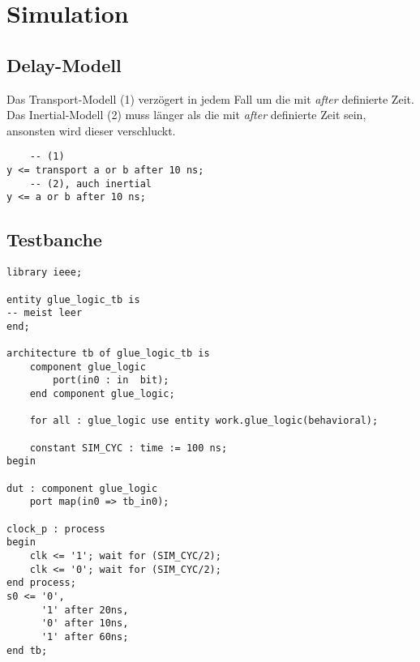 \section{Simulation}

\subsection{Delay-Modell}
Das Transport-Modell (1) verzögert in jedem Fall um die mit \textit{after} definierte Zeit.\\
Das Inertial-Modell (2) muss länger als die mit \textit{after} definierte Zeit sein, ansonsten wird dieser verschluckt.
\begin{lstlisting}
	-- (1)
y <= transport a or b after 10 ns;
	-- (2), auch inertial
y <= a or b after 10 ns;
\end{lstlisting}

\subsection{Testbanche}
\begin{lstlisting}
library ieee;

entity glue_logic_tb is
-- meist leer
end;

architecture tb of glue_logic_tb is
	component glue_logic
		port(in0 : in  bit);
	end component glue_logic;
	
	for all : glue_logic use entity work.glue_logic(behavioral);
	
	constant SIM_CYC : time := 100 ns;
begin

dut : component glue_logic
	port map(in0 => tb_in0);

clock_p : process
begin
	clk <= '1'; wait for (SIM_CYC/2);
	clk <= '0'; wait for (SIM_CYC/2);
end process;
s0 <= '0', 
      '1' after 20ns,
      '0' after 10ns,
      '1' after 60ns;
end tb;

\end{lstlisting}
